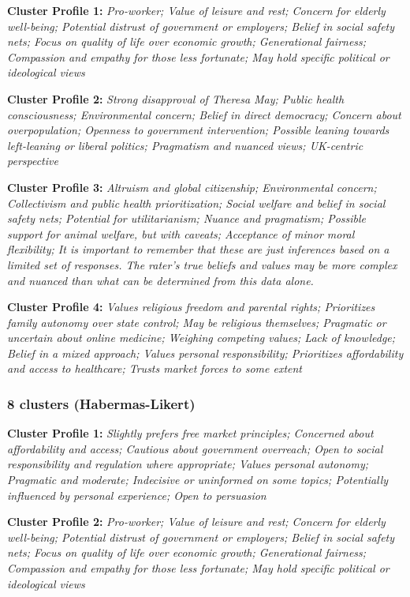 \documentclass[11pt]{article}
\newcommand{\profiletext}[1]{\textit{#1}}
\begin{document}
\textbf{Cluster Profile 1:} \profiletext{Pro-worker; Value of leisure and rest; Concern for elderly well-being; Potential distrust of government or employers; Belief in social safety nets; Focus on quality of life over economic growth; Generational fairness; Compassion and empathy for those less fortunate; May hold specific political or ideological views}

\textbf{Cluster Profile 2:} \profiletext{Strong disapproval of Theresa May; Public health consciousness; Environmental concern; Belief in direct democracy; Concern about overpopulation; Openness to government intervention; Possible leaning towards left-leaning or liberal politics; Pragmatism and nuanced views; UK-centric perspective}

\textbf{Cluster Profile 3:} \profiletext{Altruism and global citizenship; Environmental concern; Collectivism and public health prioritization; Social welfare and belief in social safety nets; Potential for utilitarianism; Nuance and pragmatism; Possible support for animal welfare, but with caveats; Acceptance of minor moral flexibility; It is important to remember that these are just inferences based on a limited set of responses. The rater's true beliefs and values may be more complex and nuanced than what can be determined from this data alone.}

\textbf{Cluster Profile 4:} \profiletext{Values religious freedom and parental rights; Prioritizes family autonomy over state control; May be religious themselves; Pragmatic or uncertain about online medicine; Weighing competing values; Lack of knowledge; Belief in a mixed approach; Values personal responsibility; Prioritizes affordability and access to healthcare; Trusts market forces to some extent}

\subsubsection{8 clusters (Habermas-Likert)}

\textbf{Cluster Profile 1:} \profiletext{Slightly prefers free market principles; Concerned about affordability and access; Cautious about government overreach; Open to social responsibility and regulation where appropriate; Values personal autonomy; Pragmatic and moderate; Indecisive or uninformed on some topics; Potentially influenced by personal experience; Open to persuasion}

\textbf{Cluster Profile 2:} \profiletext{Pro-worker; Value of leisure and rest; Concern for elderly well-being; Potential distrust of government or employers; Belief in social safety nets; Focus on quality of life over economic growth; Generational fairness; Compassion and empathy for those less fortunate; May hold specific political or ideological views}
\end{document}
